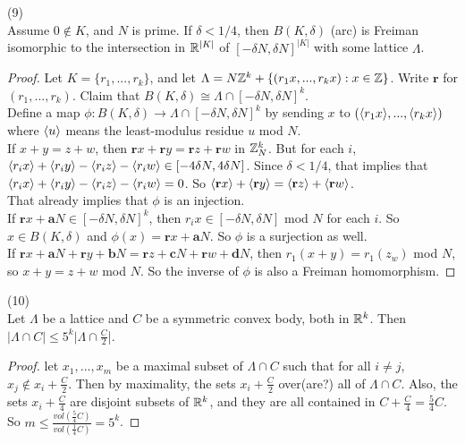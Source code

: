 \documentclass[a4paper]{article}
\begin{document}
\begin{lemma} (9)\\
    Assume $0 \not \in K$, and $N$ is prime. If $\delta < 1/4$, then $B(K,\delta)$ (arc) is Freiman isomorphic to the intersection in $\mathbb{R}^{|K|}$ of $[-\delta N, \delta N]^{|K|}$ with some lattice $\Lambda$.
    \begin{proof}
        Let $K = \{r_1,...,r_k\}$, and let $\Lambda = N\mathbb{Z}^k + \{(r_1 x,...,r_kx):x \in \mathbb{Z}\}$. Write $\mathbf{r}$ for $(r_1,...,r_k)$. Claim that $B(K,\delta) \cong \Lambda \cap [-\delta N, \delta N]^k$.\\
        Define a map $\phi:B(K,\delta) \to \Lambda \cap [-\delta N, \delta N]^k$ by sending $x$ to $(\langle r_1 x\rangle, ...,\langle r_k x\rangle)$ where $\langle u\rangle$ means the least-modulus residue $u$ mod $N$.\\
        If $x+y = z+w$, then $\mathbf{r} x +\mathbf{r} y = \mathbf{r}z+\mathbf{r}w$ in $\mathbb{Z}_N^k$. But for each $i$, $\langle r_ix\rangle+\langle r_iy\rangle-\langle r_iz\rangle-\langle r_iw\rangle \in [-4\delta N, 4\delta N]$. Since $\delta< 1/4$, that implies that $\langle r_ix\rangle +\langle r_iy\rangle-\langle r_iz\rangle-\langle r_iw\rangle =0$. So $\langle\mathbf{r}x\rangle+\langle\mathbf{r}y\rangle=\langle\mathbf{r}z\rangle+\langle\mathbf{r}w\rangle$.\\
        That already implies that $\phi$ is an injection.\\
        If $\mathbf{r}x + \mathbf{a} N \in [-\delta N,\delta N]^k$, then $r_i x \in [-\delta N,\delta N]$ mod $N$ for each $i$. So $x \in B(K,\delta)$ and $\phi(x) = \mathbf{r}x + \mathbf{a} N$. So $\phi$ is a surjection as well.\\
        If $\mathbf{r}x+\mathbf{a}N + \mathbf{r}y+\mathbf{b}N = \mathbf{r}z+\mathbf{c}N+\mathbf{r}w+\mathbf{d}N$, then $r_1(x+y) = r_1(z_w)$ mod $N$, so $x+y=z+w$ mod $N$. So the inverse of $\phi$ is also a Freiman homomorphism.
    \end{proof}
\end{lemma}

\begin{lemma} (10)\\
    Let $\Lambda$ be a lattice and $C$ be a symmetric convex body, both in $\mathbb{R}^k$. Then $|\Lambda \cap C| \leq 5^k |\Lambda \cap \frac{C}{2}$|.
    \begin{proof}
        let $x_1,...,x_m$ be a maximal subset of $\Lambda \cap C$ such that for all $i \neq j$, $x_j \not\in x_i + \frac{C}{2}$. Then by maximality, the sets $x_i+\frac{C}{2}$ over(are?) all of $\Lambda \cap C$. Also, the sets $x_i+\frac{C}{4}$ are disjoint subsets of $\mathbb{R}^k$, and they are all contained in $C+\frac{C}{4} = \frac{5}{4} C$. So $m \leq \frac{vol(\frac{5}{4}C)}{vol(\frac{1}{4}C)} = 5^k$.
    \end{proof}
\end{lemma}
\end{document}
